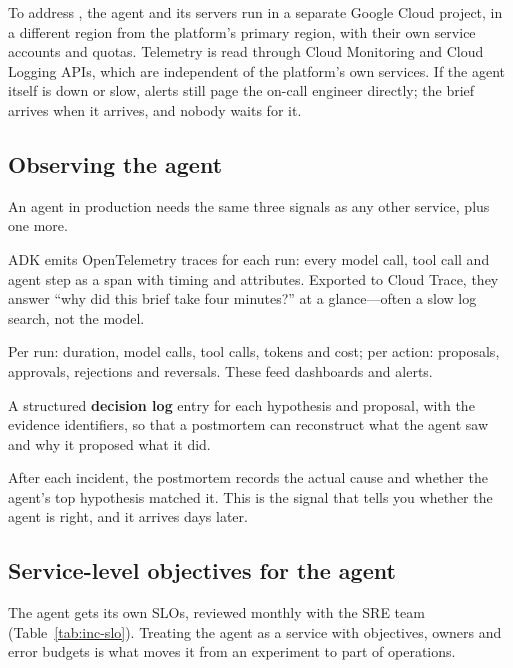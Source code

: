 To address , the agent and its servers run in a separate Google Cloud project, in a different region from the platform's primary region, with their own service accounts and quotas. Telemetry is read through Cloud Monitoring and Cloud Logging APIs, which are independent of the platform's own services. If the agent itself is down or slow, alerts still page the on-call engineer directly; the brief arrives when it arrives, and nobody waits for it.

\subsection{Observing the agent}

An agent in production needs the same three signals as any other service, plus one more.
\begin{description}[leftmargin=1em,itemsep=2pt]
  \item[Traces.] ADK emits OpenTelemetry traces for each run: every model call, tool call and agent step as a span with timing and attributes. Exported to Cloud Trace, they answer ``why did this brief take four minutes?'' at a glance---often a slow log search, not the model.
  \item[Metrics.] Per run: duration, model calls, tool calls, tokens and cost; per action: proposals, approvals, rejections and reversals. These feed dashboards and alerts.
  \item[Logs.] A structured \textbf{decision log} entry for each hypothesis and proposal, with the evidence identifiers, so that a postmortem can reconstruct what the agent saw and why it proposed what it did.
  \item[Outcomes.] After each incident, the postmortem records the actual cause and whether the agent's top hypothesis matched it. This is the signal that tells you whether the agent is right, and it arrives days later.
\end{description}

\subsection{Service-level objectives for the agent}

The agent gets its own SLOs, reviewed monthly with the SRE team (Table~\ref{tab:inc-slo}). Treating the agent as a service with objectives, owners and error budgets is what moves it from an experiment to part of operations.

